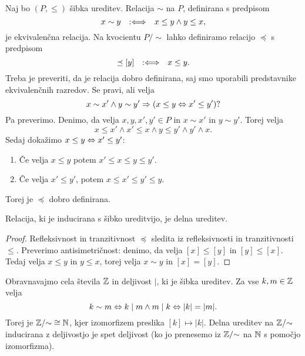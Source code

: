 Naj bo $(P, \leq)$ šibka ureditev. Relacija $\sim$ na $P$, definirana s predpisom
%
\begin{equation*}
  x \sim y \quad {{:}{\Longleftrightarrow}}\quad x \leq y \land y \leq x,
\end{equation*}
%
je ekvivalenčna relacija. Na kvocientu $P/{\sim}$ lahko definiramo relacijo $\preceq$ s
predpisom
%
\begin{equation*}
  [x] \preceq [y] \defiff x \leq y.
\end{equation*}
%
Treba je preveriti, da je relacija dobro definirana, saj smo uporabili predstavnike ekvivalenčnih razredov. Se pravi, ali velja
\begin{equation*}
  x \sim x' \land y \sim y' \Rightarrow (x \leq y \Leftrightarrow x' \leq y') ?
\end{equation*}
%
Pa preverimo. Denimo, da velja $x, y, x', y' \in P$ in $x \sim x'$ in $y \sim y'$.
Torej velja
\begin{equation*}
  x \leq x' \land x' \leq x \land y \leq y' \land y' \land x.
\end{equation*}
%
Sedaj dokažimo $x \leq y \Leftrightarrow x' \leq y'$:
%
\begin{enumerate}
\item Če velja $x \leq y$ potem $x' \leq x \leq y \leq y'$.
\item Če velja $x' \leq y'$, potem $x \leq x' \leq y' \leq y$.
\end{enumerate}
%
Torej je $\preceq$ dobro definirana.

\begin{izjava}
  Relacija, ki je inducirana s šibko ureditvijo, je delna ureditev.
\end{izjava}

\begin{proof}
  Refleksivnost in tranzitivnost $\preceq$ sledita iz refleksivnosti in tranzitivnosti~$\leq$. Preverimo antisimetričnost: denimo, da velja $[x] \leq [y]$ in $[y] \leq [x]$. Tedaj velja $x \leq y$ in $y \leq x$, torej velja $x \sim y$ in $[x] = [y]$.
\end{proof}

\begin{zgled}
  Obravnavajmo cela števila $\mathbb{Z}$ in deljivost $\mid$, ki je šibka
  ureditev. Za vse $k, m \in \mathbb{Z}$ velja
  \begin{equation*}
    k \sim m \Leftrightarrow k \mid m \land m \mid k \Leftrightarrow |k| = |m|.
  \end{equation*}
  Torej je $\mathbb{Z}/{\sim} \cong \mathbb{N}$, kjer izomorfizem preslika $[k] \mapsto |k|$. Delna ureditev na $\mathbb{Z}/{\sim}$ inducirana z deljivostjo je spet deljivost (ko jo prenesemo iz $\mathbb{Z}/{\sim}$ na $\mathbb{N}$ s pomočjo izomorfizma).
\end{zgled}


